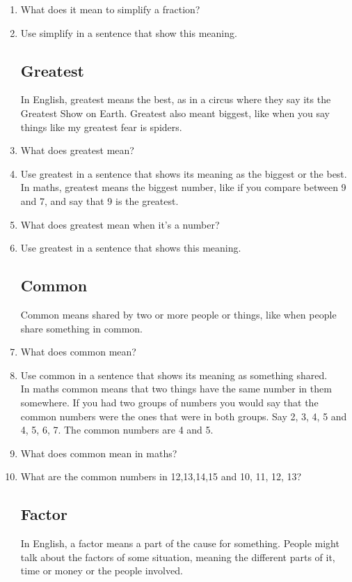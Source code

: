 \documentclass[14pt]{article}
\begin{document}
\begin{enumerate}
\item What does it mean to simplify a fraction?
\item Use simplify in a sentence that show this meaning.

\subsection*{Greatest} In English, greatest means the best, as in a circus where they say its the Greatest Show on Earth. Greatest also meant biggest, like when you say things like my greatest fear is spiders.

\item What does greatest mean?
\item Use greatest in a sentence that shows its meaning as the biggest or the best.\\

In maths, greatest means the biggest number, like if you compare between 9 and 7, and say that 9 is the greatest.\\

\item What does greatest mean when it's a number?
\item Use greatest in a sentence that shows this meaning.

\subsection*{Common} Common means shared by two or more people or things, like when people share something in common.

\item What does common mean?
\item Use common in a sentence that shows its meaning as something shared.\\

In maths common means that two things have the same number in them somewhere. If you had two groups of numbers you would say that the common numbers were the ones that were in both groups. Say 2, 3, 4, 5 and 4, 5, 6, 7. The common numbers are 4 and 5.

\item What does common mean in maths?
\item What are the common numbers in 12,13,14,15 and 10, 11, 12, 13?

\subsection*{Factor} In English, a factor means a part of the cause for something. People might talk about the factors of some situation, meaning the different parts of it, time or money or the people involved.


\end{enumerate}
\end{document}
